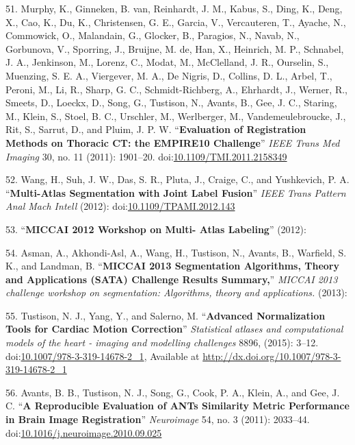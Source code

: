 \documentclass[11pt,]{article}
\begin{document}
51. Murphy, K., Ginneken, B. van, Reinhardt, J. M., Kabus, S., Ding, K.,
Deng, X., Cao, K., Du, K., Christensen, G. E., Garcia, V., Vercauteren,
T., Ayache, N., Commowick, O., Malandain, G., Glocker, B., Paragios, N.,
Navab, N., Gorbunova, V., Sporring, J., Bruijne, M. de, Han, X.,
Heinrich, M. P., Schnabel, J. A., Jenkinson, M., Lorenz, C., Modat, M.,
McClelland, J. R., Ourselin, S., Muenzing, S. E. A., Viergever, M. A.,
De Nigris, D., Collins, D. L., Arbel, T., Peroni, M., Li, R., Sharp, G.
C., Schmidt-Richberg, A., Ehrhardt, J., Werner, R., Smeets, D., Loeckx,
D., Song, G., Tustison, N., Avants, B., Gee, J. C., Staring, M., Klein,
S., Stoel, B. C., Urschler, M., Werlberger, M., Vandemeulebroucke, J.,
Rit, S., Sarrut, D., and Pluim, J. P. W. ``\textbf{Evaluation of
Registration Methods on Thoracic CT: the EMPIRE10 Challenge}''
\emph{IEEE Trans Med Imaging} 30, no. 11 (2011): 1901--20.
doi:\href{http://dx.doi.org/10.1109/TMI.2011.2158349}{10.1109/TMI.2011.2158349}

52. Wang, H., Suh, J. W., Das, S. R., Pluta, J., Craige, C., and
Yushkevich, P. A. ``\textbf{Multi-Atlas Segmentation with Joint Label
Fusion}'' \emph{IEEE Trans Pattern Anal Mach Intell} (2012):
doi:\href{http://dx.doi.org/10.1109/TPAMI.2012.143}{10.1109/TPAMI.2012.143}

53. ``\textbf{MICCAI 2012 Workshop on Multi- Atlas Labeling}'' (2012):

54. Asman, A., Akhondi-Asl, A., Wang, H., Tustison, N., Avants, B.,
Warfield, S. K., and Landman, B. ``\textbf{MICCAI 2013 Segmentation
Algorithms, Theory and Applications (SATA) Challenge Results Summary,}''
\emph{MICCAI 2013 challenge workshop on segmentation: Algorithms, theory
and applications.} (2013):

55. Tustison, N. J., Yang, Y., and Salerno, M. ``\textbf{Advanced
Normalization Tools for Cardiac Motion Correction}'' \emph{Statistical
atlases and computational models of the heart - imaging and modelling
challenges} 8896, (2015): 3--12.
doi:\href{http://dx.doi.org/10.1007/978-3-319-14678-2_1}{10.1007/978-3-319-14678-2\_1},
Available at \url{http://dx.doi.org/10.1007/978-3-319-14678-2_1}

56. Avants, B. B., Tustison, N. J., Song, G., Cook, P. A., Klein, A.,
and Gee, J. C. ``\textbf{A Reproducible Evaluation of ANTs Similarity
Metric Performance in Brain Image Registration}'' \emph{Neuroimage} 54,
no. 3 (2011): 2033--44.
doi:\href{http://dx.doi.org/10.1016/j.neuroimage.2010.09.025}{10.1016/j.neuroimage.2010.09.025}
\end{document}
